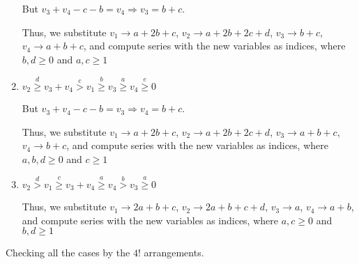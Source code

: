 \documentclass{article}
\begin{document}
\begin{enumerate}
But $v_3+v_4-c-b=v_4\Rightarrow{v_3=b+c}.$

Thus, we substitute $v_1\rightarrow{a+2b+c}$, $v_2\rightarrow{a+2b+2c+d}$, $v_3\rightarrow{b+c}$, $v_4\rightarrow{a+b+c}$, and compute series with the new variables as indices, where $b,d\geq{0}$ and $a,c\geq{1}$
    \item 
$v_2\overset{d}{\geq}v_3+v_4\overset{c}{>}v_1\overset{b}{\geq}{v_3}\overset{a}{\geq}v_4\overset{e}{\geq}{0}$

But $v_3+v_4-c-b=v_3\Rightarrow{v_4=b+c}.$

Thus, we substitute $v_1\rightarrow{a+2b+c}$, $v_2\rightarrow{a+2b+2c+d}$, $v_3\rightarrow{a+b+c}$, $v_4\rightarrow{b+c}$, and compute series with the new variables as indices, where $a,b,d\geq{0}$ and $c\geq{1}$
    \item 
$v_2\overset{d}{>}v_1\overset{c}{\geq}v_3+v_4\overset{a}{\geq}{v_4}\overset{b}{>}v_3\overset{a}{\geq}{0}$

Thus, we substitute 
$v_1\rightarrow{2a+b+c}$, 
$v_2\rightarrow{2a+b+c+d}$, 
$v_3\rightarrow{a}$, 
$v_4\rightarrow{a+b}$, and compute series with the new variables as indices, where $a,c\geq{0}$ and $b,d\geq{1}$
\end{enumerate}


Checking all the cases by the $4!$ arrangements.
\end{document}
